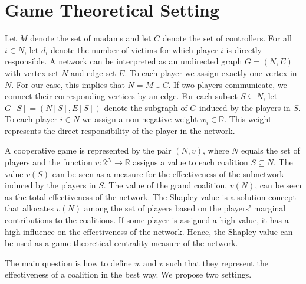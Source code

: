 \documentclass[11p]{article}
\theoremstyle{definition}
\theoremstyle{definition}
\theoremstyle{theorm}
\begin{document}
\section{Game Theoretical Setting}
Let $M$ denote the set of madams and let $C$ denote the set of controllers. For all $i \in N$, let $d_i$ denote the number of victims for which player $i$ is directly responsible. A network can be interpreted as an undirected graph $G = (N,E)$ with vertex set $N$ and edge set $E$. To each player we assign exactly one vertex in $N$. For our case, this implies that $N = M \cup C$. If two players communicate, we connect their corresponding vertices by an edge. For each subset $S \subseteq N$, let $G[S] = (N[S], E[S])$ denote the subgraph of $G$ induced by the players in $S$. To each player $i \in N$ we assign a non-negative weight $w_i \in \mathbb{R}$. This weight represents the direct responsibility of the player in the network. 

A cooperative game is represented by the pair $(N,v)$, where $N$ equals the set of players and the function $v : 2^N \rightarrow \mathbb{R}$ assigns a value to each coalition $S \subseteq N$. The value $v(S)$ can be seen as a measure for the effectiveness of the subnetwork induced by the players in $S$. The value of the grand coalition, $v(N)$, can be seen as the total effectiveness of the network. The Shapley value \cite{shapley1953value} is a solution concept that allocates $v(N)$ among the set of players based on the players' marginal contributions to the coalitions. If some player is assigned a high value, it has a high influence on the effectiveness of the network. Hence, the Shapley value can be used as a game theoretical centrality measure of the network.

The main question is how to define $w$ and $v$ such that they represent the effectiveness of a coalition in the best way. We propose two settings. 
\end{document}
